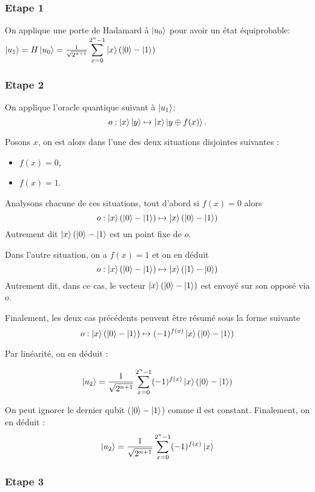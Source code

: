 \subsubsection{Etape 1}

On applique une porte de Hadamard à $\ket{u_0}$ pour avoir un état équiprobable:
$\ket{u_1} = H\ket{u_0} = \frac{1}{\sqrt{2^{n + 1}}}
\displaystyle\sum_{x=0}^{2^n-1} \ket{x}(\ket{0} - \ket{1})$

\subsubsection{Etape 2}
On applique l'oracle quantique suivant à $\ket{u_1}$:
\[ o : \ket{x}\ket{y}\mapsto \ket{x}\ket{y\oplus f(x)}. \]

Posons $x$, on est alors dans l'une des deux situations disjointes suivantes :
\begin{itemize}
\item $f(x) = 0$,
\item $f(x) = 1$.
\end{itemize}

Analysons chacune de ces situations, tout d'abord si $f(x) = 0$ alors
\[
o : \ket{x}(\ket{0} - \ket{1}) \mapsto \ket{x}(\ket{0} - \ket{1})
\]
Autrement dit $\ket{x}(\ket{0} - \ket{1}$ est un  point fixe de $o$.

Dans l'autre situation, on a $f(x) = 1$ et on en déduit
\[
o : \ket{x}(\ket{0} - \ket{1}) \mapsto \ket{x}(\ket{1} - \ket{0})
\]
Autrement dit, dans ce cas, le vecteur $\ket{x}(\ket{0} - \ket{1})$
est envoyé sur son opposé via $o$.

Finalement, les deux cas précédents peuvent être résumé sous la forme suivante
\[
o : \ket{x}(\ket{0} - \ket{1}) \mapsto (-1)^{f(x)}\ket{x}(\ket{0} - \ket{1})
\]

Par linéarité, on en déduit :

\begin{equation}\ket{u_2} = \frac{1}{\sqrt{2^{n + 1}}} 
\displaystyle\sum_{x=0}^{2^n-1} (-1)^{f(x)}\ket{x}(\ket{0} - \ket{1}) 
\end{equation}

On peut ignorer le dernier qubit ($\ket{0} - \ket{1}$) comme il est
constant. Finalement, on en déduit :
\begin{equation}
\ket{u_2} = \frac{1}{\sqrt{2^{n + 1}}}
\displaystyle\sum_{x=0}^{2^n-1} (-1)^{f(x)}\ket{x}
\end{equation}

\subsubsection{Etape 3}

